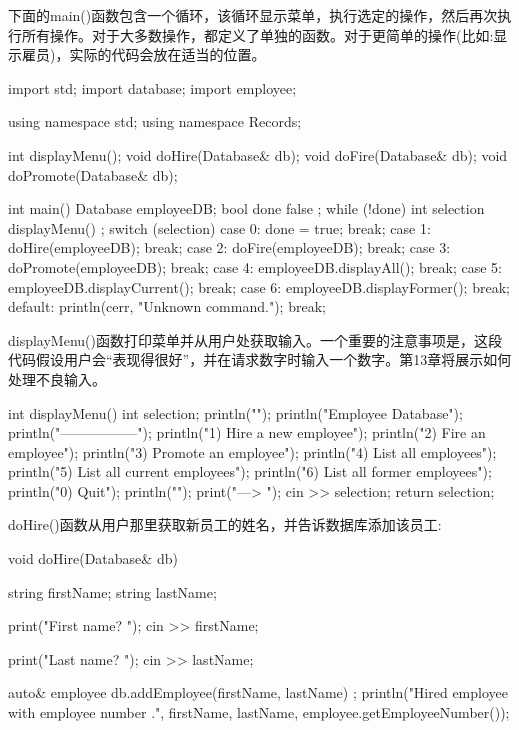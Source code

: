 下面的main()函数包含一个循环，该循环显示菜单，执行选定的操作，然后再次执行所有操作。对于大多数操作，都定义了单独的函数。对于更简单的操作(比如:显示雇员)，实际的代码会放在适当的位置。

\begin{cpp}
import std;
import database;
import employee;

using namespace std;
using namespace Records;

int displayMenu();
void doHire(Database& db);
void doFire(Database& db);
void doPromote(Database& db);

int main()
{
    Database employeeDB;
    bool done { false };
    while (!done) {
        int selection { displayMenu() };
        switch (selection) {
        case 0:
            done = true;
            break;
        case 1:
            doHire(employeeDB);
            break;
        case 2:
            doFire(employeeDB);
            break;
        case 3:
            doPromote(employeeDB);
            break;
        case 4:
            employeeDB.displayAll();
            break;
        case 5:
            employeeDB.displayCurrent();
            break;
        case 6:
            employeeDB.displayFormer();
            break;
        default:
            println(cerr, "Unknown command.");
            break;
        }
    }
}
\end{cpp}

displayMenu()函数打印菜单并从用户处获取输入。一个重要的注意事项是，这段代码假设用户会“表现得很好”，并在请求数字时输入一个数字。第13章将展示如何处理不良输入。

\begin{cpp}
int displayMenu()
{
    int selection;
    println("");
    println("Employee Database");
    println("-----------------");
    println("1) Hire a new employee");
    println("2) Fire an employee");
    println("3) Promote an employee");
    println("4) List all employees");
    println("5) List all current employees");
    println("6) List all former employees");
    println("0) Quit");
    println("");
    print("---> ");
    cin >> selection;
    return selection;
}
\end{cpp}

doHire()函数从用户那里获取新员工的姓名，并告诉数据库添加该员工:

\begin{cpp}
void doHire(Database& db)
{
    string firstName;
    string lastName;

    print("First name? ");
    cin >> firstName;

    print("Last name? ");
    cin >> lastName;

    auto& employee { db.addEmployee(firstName, lastName) };
    println("Hired employee {} {} with employee number {}.",
        firstName, lastName, employee.getEmployeeNumber());
}
\end{cpp}

